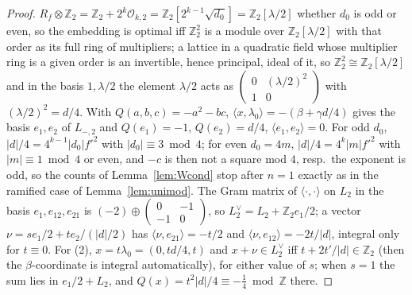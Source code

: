 \documentclass[11pt,reqno]{amsart}
\theoremstyle{plain}
\theoremstyle{definition}
\newcommand{\Z}{\mathbb{Z}}
\begin{document}
\begin{proof}
$R_f\otimes\Z_2=\Z_2+2^k\mathcal O_{k,2}=\Z_2[2^{k-1}\sqrt{d_0}]=\Z_2[\lambda/2]$ whether $d_0$ is
odd or even, so the embedding is optimal iff $\Z_2^2$ is a module over $\Z_2[\lambda/2]$ with that
order as its full ring of multipliers; a lattice in a quadratic field whose multiplier ring is a
given order is an invertible, hence principal, ideal of it, so $\Z_2^2\cong\Z_2[\lambda/2]$ and in
the basis $1,\lambda/2$ the element $\lambda/2$ acts as $\begin{pmatrix}0&(\lambda/2)^2\\1&0
\end{pmatrix}$ with $(\lambda/2)^2=d/4$. With $Q(a,b,c)=-a^2-bc$, $\langle x,\lambda_0\rangle=
-(\beta+\gamma d/4)$ gives the basis $e_1,e_2$ of $L_{-,2}$ and $Q(e_1)=-1$, $Q(e_2)=d/4$,
$\langle e_1,e_2\rangle=0$. For odd $d_0$, $\lvert d\rvert/4=4^{k-1}\lvert d_0\rvert f'^2$ with
$\lvert d_0\rvert\equiv3\bmod4$; for even $d_0=4m$, $\lvert d\rvert/4=4^k\lvert m\rvert f'^2$ with
$\lvert m\rvert\equiv1\bmod4$ or even, and $-c$ is then not a square mod $4$, resp.\ the exponent
is odd, so the counts of Lemma~\ref{lem:Wcond} stop after $n=1$ exactly as in the ramified case
of Lemma~\ref{lem:unimod}. The Gram matrix of $\langle\cdot,\cdot\rangle$ on $L_2$ in the basis
$e_1,e_{12},e_{21}$ is $(-2)\oplus\begin{pmatrix}0&-1\\-1&0\end{pmatrix}$, so $L_2^\vee=L_2+\Z_2
e_1/2$; a vector $\nu=se_1/2+te_2/(\lvert d\rvert/2)$ has $\langle\nu,e_{21}\rangle=-t/2$ and
$\langle\nu,e_{12}\rangle=-2t/\lvert d\rvert$, integral only for $t\equiv0$. For (2), $x=t\lambda_0
=(0,td/4,t)$ and $x+\nu\in L_2^\vee$ iff $t+2t'/\lvert d\rvert\in\Z_2$ (then the $\beta$-coordinate
is integral automatically), for either value of $s$; when $s=1$ the sum lies in $e_1/2+L_2$, and
$Q(x)=t^2\lvert d\rvert/4\equiv-\tfrac14\bmod\Z$ there.
\end{proof}
\end{document}
